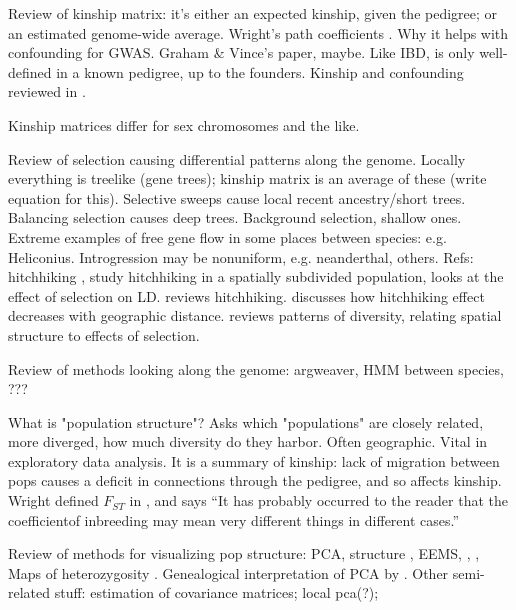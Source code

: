 \documentclass[11pt, oneside]{article}   	%
\begin{document}
Review of kinship matrix: 
it's either an expected kinship, given the pedigree;
or an estimated genome-wide average.
Wright's path coefficients \citep{wright1943isolation}.
Why it helps with confounding for GWAS.
Graham \& Vince's paper, maybe.
Like IBD, is only well-defined in a known pedigree, up to the founders.
Kinship and confounding reviewed in \citet{astle2009population}.

Kinship matrices differ for sex chromosomes and the like.

Review of selection causing differential patterns along the genome.
Locally everything is treelike (gene trees);
kinship matrix is an average of these (write equation for this).
Selective sweeps cause local recent ancestry/short trees.
Balancing selection causes deep trees.
Background selection, shallow ones.
Extreme examples of free gene flow in some places between species: e.g. Heliconius.
Introgression may be nonuniform, e.g. neanderthal, others.
Refs: hitchhiking \citep{maynardsmith1974hitchhiking},
\citet{kim2011hitchhiking} study hitchhiking in a spatially subdivided population,
\citet{mcvean2007structure} looks at the effect of selection on LD.
\citet{barton2000genetic} reviews hitchhiking.
\citet{bierne2010distinctive} discusses how hitchhiking effect decreases with geographic distance.
\citet{charlesworth2003review} reviews patterns of diversity, relating spatial structure to effects of selection.

Review of methods looking along the genome:
argweaver, HMM between species, ???

What is "population structure"?
Asks which "populations" are closely related, more diverged, how much diversity do they harbor.
Often geographic.
Vital in exploratory data analysis.
It is a summary of kinship: 
lack of migration between pops causes a deficit in connections through the pedigree,
and so affects kinship.
Wright defined $F_{ST}$ in \citep{wright1949genetical}, and says ``It has probably occurred to the reader that the coefficientof inbreeding may mean very different
things in different cases.''

Review of methods for visualizing pop structure:
PCA, structure \citep{falush2003inference}, EEMS, \citep{petkova2014visualizing}, \citep{yang2012modelbased},
Maps of heterozygosity \citep{ramachandran2005support}.
Genealogical interpretation of PCA by \citet{mcvean2009genealogical}.
Other semi-related stuff:
estimation of covariance matrices;
local pca(?);
\end{document}
